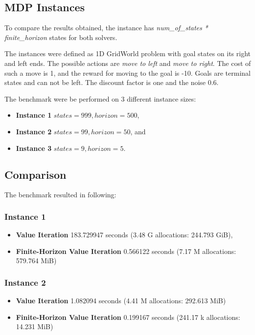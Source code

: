 \subsection{MDP Instances}

To compare the results obtained, the instance has \textit{num\_of\_states * finite\_horizon} states for both solvers.

The instances were defined as 1D GridWorld problem with goal states on its right and left ends. The possible actions are \textit{move to left} and \textit{move to right}. The cost of such a move is 1, and the reward for moving to the goal is -10. Goals are terminal states and can not be left. The discount factor is one and the noise 0.6.

The benchmark were be performed on 3 different instance sizes:
\begin{itemize}
    \item \textbf{Instance 1} $states = 999, horizon = 500$,
    \item \textbf{Instance 2} $states = 99, horizon = 50$, and
    \item \textbf{Instance 3} $states = 9, horizon = 5$.
\end{itemize}

\subsection{Comparison}

The benchmark resulted in following:

\subsubsection{Instance 1}

\begin{itemize}
    \item \textbf{Value Iteration} 183.729947 seconds (3.48 G allocations: 244.793 GiB),
    \item \textbf{Finite-Horizon Value Iteration}   0.566122 seconds (7.17 M allocations: 579.764 MiB)
\end{itemize}

\subsubsection{Instance 2}

\begin{itemize}
    \item \textbf{Value Iteration} 1.082094 seconds (4.41 M allocations: 292.613 MiB)
    \item \textbf{Finite-Horizon Value Iteration}   0.199167 seconds (241.17 k allocations: 14.231 MiB)
\end{itemize}

